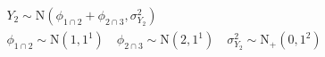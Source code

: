 \begin{equation}
\begin{gathered}
  Y_{2} \sim \text{N}(\phi_{1 \cap 2} + \phi_{2 \cap 3}, \sigma^{2}_{Y_{2}}) \\
  \phi_{1 \cap 2} \sim \text{N}(1, 1^1) \quad
  \phi_{2 \cap 3} \sim \text{N}(2, 1^1) \quad
  \sigma^{2}_{Y_{2}} \sim \text{N}_{+}(0, 1^2)
  \label{eqn:model-2-specification}  
\end{gathered}
\end{equation}